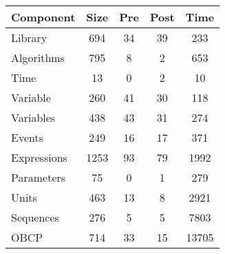 \documentclass[10pt,a4paper,twocolumn]{article}
\begin{document}



\begin{tabular}{|l|c|c|c|c|}
\hline
{\bf Component}   & {\bf Size} & {\bf Pre} & {\bf Post} & {\bf Time} \\
\hline
Library     &  694 &  34 &   39 &   233 \\
\hline
Algorithms  &  795 &   8 &    2 &   653 \\
\hline
Time        &   13 &   0 &    2 &    10 \\
\hline
Variable    &  260 &  41 &   30 &   118 \\
\hline
Variables   &  438 &  43 &   31 &   274 \\
\hline
Events      &  249 &  16 &   17 &   371 \\
\hline
Expressions & 1253 &  93 &   79 &  1992 \\
\hline
Parameters  &   75 &   0 &    1 &   279 \\
\hline
Units       &  463 &  13 &    8 &  2921 \\
\hline
Sequences   &  276 &   5 &    5 &  7803 \\
\hline
OBCP        &  714 &  33 &   15 & 13705 \\
\hline
\end{tabular}
\end{document}
